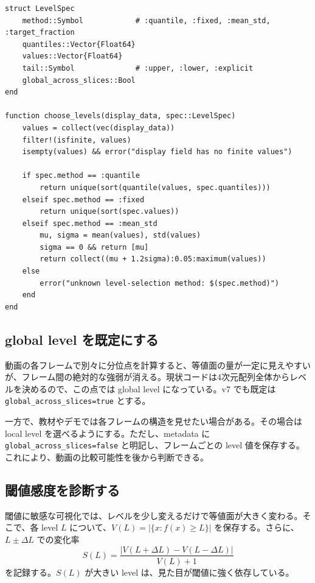 \documentclass[uplatex,dvipdfmx,ja=standard,11pt,a4paper]{bxjsarticle}
\newcommand{\code}[1]{\texttt{#1}}
\begin{document}
\begin{lstlisting}[style=julia,caption={level selection の型案}]
struct LevelSpec
    method::Symbol            # :quantile, :fixed, :mean_std, :target_fraction
    quantiles::Vector{Float64}
    values::Vector{Float64}
    tail::Symbol              # :upper, :lower, :explicit
    global_across_slices::Bool
end

function choose_levels(display_data, spec::LevelSpec)
    values = collect(vec(display_data))
    filter!(isfinite, values)
    isempty(values) && error("display field has no finite values")

    if spec.method == :quantile
        return unique(sort(quantile(values, spec.quantiles)))
    elseif spec.method == :fixed
        return unique(sort(spec.values))
    elseif spec.method == :mean_std
        mu, sigma = mean(values), std(values)
        sigma == 0 && return [mu]
        return collect((mu + 1.2sigma):0.05:maximum(values))
    else
        error("unknown level-selection method: $(spec.method)")
    end
end
\end{lstlisting}

\subsection{global level を既定にする}
動画の各フレームで別々に分位点を計算すると、等値面の量が一定に見えやすいが、フレーム間の絶対的な強弱が消える。現状コードは4次元配列全体からレベルを決めるので、この点では global level になっている\cite{VisualizingVisualization}。v7 でも既定は \code{global\_across\_slices=true} とする。

一方で、教材やデモでは各フレームの構造を見せたい場合がある。その場合は local level を選べるようにする。ただし、metadata に \code{global\_across\_slices=false} と明記し、フレームごとの level 値を保存する。これにより、動画の比較可能性を後から判断できる。

\subsection{閾値感度を診断する}
閾値に敏感な可視化では、レベルを少し変えるだけで等値面が大きく変わる。そこで、各 level \(L\) について、\(V(L)=|\{x:f(x)\ge L\}|\) を保存する。さらに、\(L\pm\Delta L\) での変化率
\begin{equation}
  S(L)=\frac{|V(L+\Delta L)-V(L-\Delta L)|}{V(L)+1}
\end{equation}
を記録する。\(S(L)\) が大きい level は、見た目が閾値に強く依存している。
\end{document}
